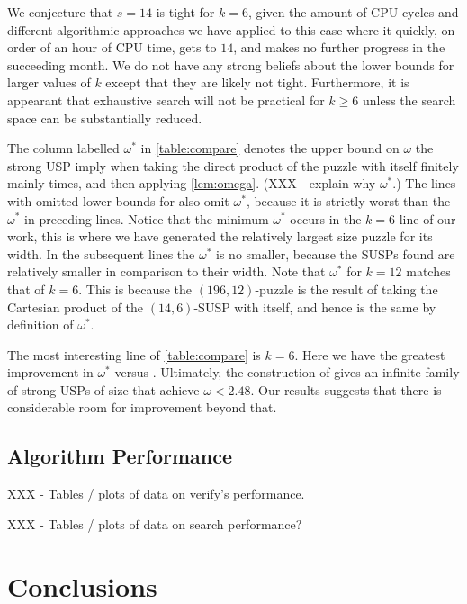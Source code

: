\documentclass[11pt]{article}
\begin{document}
We conjecture that $s = 14$ is tight for $k = 6$, given the amount of
CPU cycles and different algorithmic approaches we have applied to
this case where it quickly, on order of an hour of CPU time, gets to
$14$, and makes no further progress in the succeeding month.  We do
not have any strong beliefs about the lower bounds for larger values
of $k$ except that they are likely not tight.  Furthermore, it is
appearant that exhaustive search will not be practical for $k \ge 6$
unless the search space can be substantially reduced.

The column labelled $\omega^*$ in \autoref{table:compare} denotes the
upper bound on $\omega$ the strong USP imply when taking the direct
product of the puzzle with itself finitely mainly times, and then
applying \autoref{lem:omega}.  (XXX - explain why $\omega ^*$.)  The
lines with omitted lower bounds for \cite{cksu05} also omit
$\omega^*$, because it is strictly worst than the $\omega^*$ in
preceding lines.  Notice that the minimum $\omega^*$ occurs in the $k
= 6$ line of our work, this is where we have generated the relatively
largest size puzzle for its width.  In the subsequent lines the
$\omega^*$ is no smaller, because the SUSPs found are relatively
smaller in comparison to their width.  Note that $\omega^*$ for $k =
12$ matches that of $k = 6$.  This is because the $(196, 12)$-puzzle
is the result of taking the Cartesian product of the $(14,6)$-SUSP
with itself, and hence is the same by definition of $\omega^*$.

The most interesting line of \autoref{table:compare} is $k = 6$.  Here
we have the greatest improvement in $\omega^*$ versus \cite{cksu05}.
Ultimately, the construction of \cite[Proposition 3.8]{cksu05} gives
an infinite family of strong USPs of size that achieve $\omega <
2.48$. Our results suggests that there is considerable room for
improvement beyond that.


\subsection{Algorithm Performance}
\label{subsec:performance}

XXX - Tables / plots of data on verify's performance.

XXX - Tables / plots of data on search performance?

\section{Conclusions}
\label{sec:conclusion}
\end{document}
